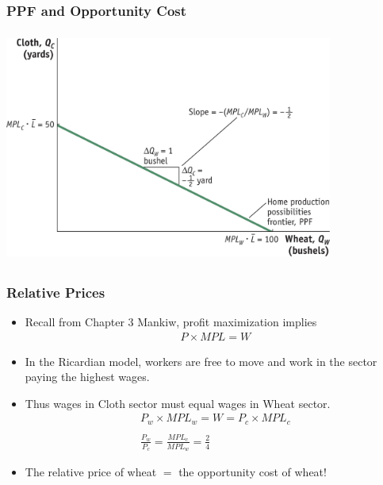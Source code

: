 \documentclass[handout]{beamer}
\begin{document}
\begin{frame}[t]
\frametitle{PPF and Opportunity Cost}
\vspace{.2cm}
\includegraphics[height=3in,width=4.25in]{Feenstra_Essentials2e_fig_02_01.jpg}
\end{frame}



\begin{frame}[t]
\frametitle{Relative Prices}
\begin{itemize}
\item Recall from Chapter 3 Mankiw, profit maximization implies
\begin{eqnarray*}
P \times MPL = W
\end{eqnarray*}
\item In the Ricardian model, workers are free to move and work in the sector paying the highest wages.
\bigskip
\item Thus wages in Cloth sector must equal wages in Wheat sector.
\begin{eqnarray*}
P_w \times MPL_w = W = P_c \times MPL_c\\
\\
\frac{P_w}{P_c} = \frac{MPL_c}{MPL_w} = \frac{2}{4}
\end{eqnarray*}
\medskip
\item The relative price of wheat $=$ the opportunity cost of wheat!
\end{itemize}
\bigskip
\end{frame}

\end{document}
